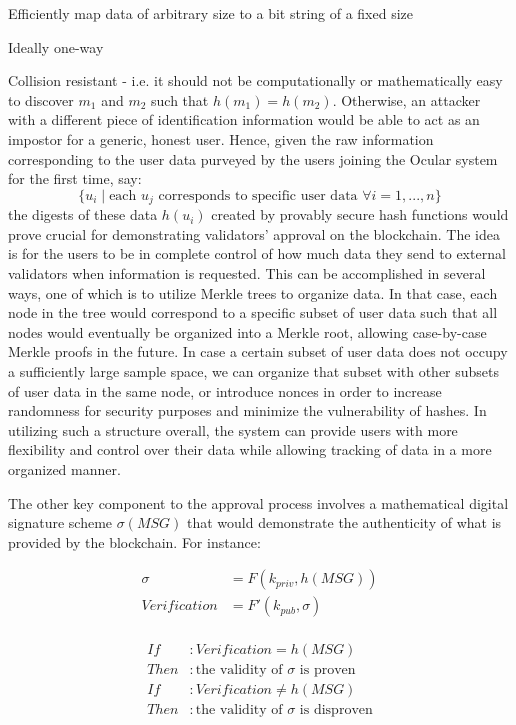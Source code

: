 \documentclass[a4paper]{article}
\let\tempone\itemize
\let\temptwo\enditemize
\renewenvironment{itemize}{\tempone\addtolength{\itemsep}{-5pt}}{\temptwo}
\begin{document}
\begin{itemize}
\item Efficiently map data of arbitrary size to a bit string of a fixed size
\item Ideally one-way
\item Collision resistant - i.e. it should not be computationally or mathematically easy to discover $m_1$ and $m_2$ such that $h(m_1)=h(m_2)$. Otherwise, an attacker with a different piece of identification information would be able to act as an impostor for a generic, honest user.
\end{itemize} Hence, given the raw information corresponding to the user data purveyed by the users joining the Ocular system for the first time, say: $$\{u_i\mid\text{each }u_j\text{ corresponds to specific user data }\forall i=1,...,n\}$$ the digests of these data $h(u_i)$ created by provably secure hash functions would prove crucial for demonstrating validators' approval on the blockchain.
The idea is for the users to be in complete control of how much data they send to external validators when information is requested. This can be accomplished in several ways, one of which is to utilize Merkle trees to organize data. In that case, each node in the tree would correspond to a specific subset of user data such that all nodes would eventually be organized into a Merkle root, allowing case-by-case Merkle proofs in the future. In case a certain subset of user data does not occupy a sufficiently large sample space, we can organize that subset with other subsets of user data in the same node, or introduce nonces in order to increase randomness for security purposes and minimize the vulnerability of hashes. In utilizing such a structure overall, the system can provide users with more flexibility and control over their data while allowing tracking of data in a more organized manner.

The other key component to the approval process involves a mathematical digital signature scheme $\sigma(MSG)$ that would demonstrate the authenticity of what is provided by the blockchain. For instance:

\begin{align*}
\sigma &= F(k_{priv}, h(MSG))\\
Verification &= F'(k_{pub}, \sigma)
\end{align*}\\
\begin{align*}
If&: Verification=h(MSG)\\
Then&: \text{the validity of $\sigma$ is proven}\\
If&: Verification\neq h(MSG)\\
Then&: \text{the validity of $\sigma$ is disproven}
\end{align*}
\end{document}
